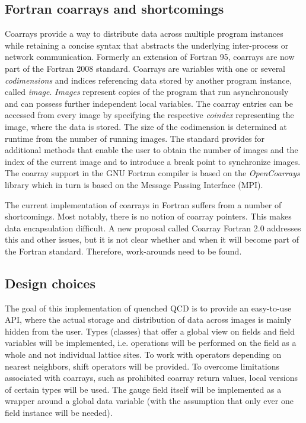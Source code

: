 \documentclass[graybox]{svmult}
\begin{document}
\subsection{Fortran coarrays and shortcomings}
Coarrays provide a way to distribute data across multiple program instances while retaining a concise syntax that abstracts the underlying inter-process or network communication. Formerly an extension of Fortran 95, coarrays are now part of the Fortran 2008 standard. Coarrays are variables with one or several \emph{codimensions} and indices referencing data stored by another program instance, called \emph{image}. \emph{Images} represent copies of the program that run asynchronously and can possess further independent local variables. The coarray entries can be accessed from every image by specifying the respective \emph{coindex} representing the image, where the data is stored. The size of the codimension is determined at runtime from the number of running images. The standard provides for additional methods that enable the user to obtain the number of images and the index of the current image and to introduce a break point to synchronize images. The coarray support in the GNU Fortran compiler is based on the \emph{OpenCoarrays} \cite{opencoarrays} library which in turn is based on the Message Passing Interface (MPI).

The current implementation of coarrays in Fortran suffers from a number of shortcomings. Most notably, there is no notion of coarray pointers. This makes data encapsulation difficult. A new proposal called Coarray Fortran 2.0 \cite{coarr2.0} addresses this and other issues, but it is not clear whether and when it will become part of the Fortran standard. Therefore, work-arounds need to be found.

\subsection{Design choices}
The goal of this implementation of quenched QCD is to provide an easy-to-use API, where the actual storage and distribution of data across images is mainly hidden from the user. Types (classes) that offer a global view on fields and field variables will be implemented, i.e. operations will be performed on the field as a whole and not individual lattice sites. To work with operators depending on nearest neighbors, shift operators will be provided. To overcome limitations associated with coarrays, such as prohibited coarray return values, local versions of certain types will be used. The gauge field itself will be implemented as a wrapper around a global data variable (with the assumption that only ever one field instance will be needed).
\end{document}
